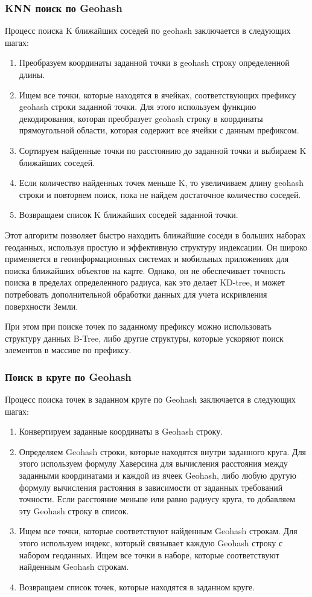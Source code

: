 \subsubsection{KNN поиск по Geohash}
Процесс поиска K ближайших соседей по geohash заключается в следующих шагах:
\begin{enumerate}
    \item Преобразуем координаты заданной точки в geohash строку определенной длины.
    \item Ищем все точки, которые находятся в ячейках, соответствующих префиксу geohash строки заданной точки. Для этого используем функцию декодирования, которая преобразует geohash строку в координаты прямоугольной области, которая содержит все ячейки с данным префиксом.
    \item Сортируем найденные точки по расстоянию до заданной точки и выбираем K ближайших соседей.
    \item Если количество найденных точек меньше K, то увеличиваем длину geohash строки и повторяем поиск, пока не найдем достаточное количество соседей.
    \item Возвращаем список K ближайших соседей заданной точки.
\end{enumerate}

Этот алгоритм позволяет быстро находить ближайшие соседи в больших наборах геоданных, используя простую и эффективную структуру индексации. Он широко применяется в геоинформационных системах и мобильных приложениях для поиска ближайших объектов на карте. Однако, он не обеспечивает точность поиска в пределах определенного радиуса, как это делает KD-tree, и может потребовать дополнительной обработки данных для учета искривления поверхности Земли.

При этом при поиске точек по заданному префиксу можно использовать структуру данных B-Tree, либо другие структуры, которые ускоряют поиск элементов в массиве по префиксу.

\subsubsection{Поиск в круге по Geohash}

Процесс поиска точек в заданном круге по Geohash заключается в следующих шагах:
\begin{enumerate}
    \item Конвертируем заданные координаты в Geohash строку.
    \item Определяем Geohash строки, которые находятся внутри заданного круга. Для этого используем формулу Хаверсина для вычисления расстояния между заданными координатами и каждой из ячеек Geohash, либо любую другую формулу вычисления растояния в зависимости от заданных требований точности. Если расстояние меньше или равно радиусу круга, то добавляем эту Geohash строку в список.
    \item Ищем все точки, которые соответствуют найденным Geohash строкам. Для этого используем индекс, который связывает каждую Geohash строку с набором геоданных. Ищем все точки в наборе, которые соответствуют найденным Geohash строкам.
    \item Возвращаем список точек, которые находятся в заданном круге.
\end{enumerate}

